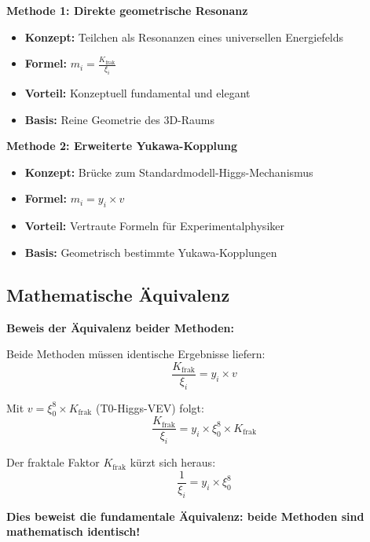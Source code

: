 \documentclass[12pt,a4paper]{article}
\begin{document}
	\begin{method}
		\textbf{Methode 1: Direkte geometrische Resonanz}
		\begin{itemize}
			\item \textbf{Konzept:} Teilchen als Resonanzen eines universellen Energiefelds
			\item \textbf{Formel:} $m_i = \frac{K_{\text{frak}}}{\xi_i}$
			\item \textbf{Vorteil:} Konzeptuell fundamental und elegant
			\item \textbf{Basis:} Reine Geometrie des 3D-Raums
		\end{itemize}
		
		\textbf{Methode 2: Erweiterte Yukawa-Kopplung}
		\begin{itemize}
			\item \textbf{Konzept:} Brücke zum Standardmodell-Higgs-Mechanismus
			\item \textbf{Formel:} $m_i = y_i \times v$
			\item \textbf{Vorteil:} Vertraute Formeln für Experimentalphysiker
			\item \textbf{Basis:} Geometrisch bestimmte Yukawa-Kopplungen
		\end{itemize}
	\end{method}
	
	\subsection{Mathematische Äquivalenz}
	
	\begin{equivalence}
		\textbf{Beweis der Äquivalenz beider Methoden:}
		
		Beide Methoden müssen identische Ergebnisse liefern:
		\begin{equation}
			\frac{K_{\text{frak}}}{\xi_i} = y_i \times v
		\end{equation}
		
		Mit $v = \xi_0^8 \times K_{\text{frak}}$ (T0-Higgs-VEV) folgt:
		\begin{equation}
			\frac{K_{\text{frak}}}{\xi_i} = y_i \times \xi_0^8 \times K_{\text{frak}}
		\end{equation}
		
		Der fraktale Faktor $K_{\text{frak}}$ kürzt sich heraus:
		\begin{equation}
			\frac{1}{\xi_i} = y_i \times \xi_0^8
		\end{equation}
		
		\textbf{Dies beweist die fundamentale Äquivalenz: beide Methoden sind mathematisch identisch!}
	\end{equivalence}
	
\end{document}
